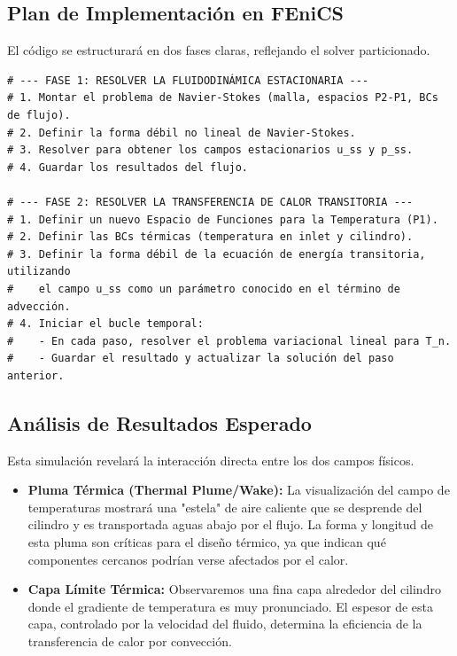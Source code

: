 \subsection{Plan de Implementación en FEniCS}
El código se estructurará en dos fases claras, reflejando el solver particionado.

\begin{tcolorbox}[colback=CodeBackground, title=Estructura del Script de Simulación de Convección Forzada]
\begin{lstlisting}[style=pythonstyle]
# --- FASE 1: RESOLVER LA FLUIDODINÁMICA ESTACIONARIA ---
# 1. Montar el problema de Navier-Stokes (malla, espacios P2-P1, BCs de flujo).
# 2. Definir la forma débil no lineal de Navier-Stokes.
# 3. Resolver para obtener los campos estacionarios u_ss y p_ss.
# 4. Guardar los resultados del flujo.

# --- FASE 2: RESOLVER LA TRANSFERENCIA DE CALOR TRANSITORIA ---
# 1. Definir un nuevo Espacio de Funciones para la Temperatura (P1).
# 2. Definir las BCs térmicas (temperatura en inlet y cilindro).
# 3. Definir la forma débil de la ecuación de energía transitoria, utilizando
#    el campo u_ss como un parámetro conocido en el término de advección.
# 4. Iniciar el bucle temporal:
#    - En cada paso, resolver el problema variacional lineal para T_n.
#    - Guardar el resultado y actualizar la solución del paso anterior.
\end{lstlisting}
\end{tcolorbox}

\subsection{Análisis de Resultados Esperado}
Esta simulación revelará la interacción directa entre los dos campos físicos.
\begin{itemize}
    \item \textbf{Pluma Térmica (Thermal Plume/Wake):} La visualización del campo de temperaturas mostrará una "estela" de aire caliente que se desprende del cilindro y es transportada aguas abajo por el flujo. La forma y longitud de esta pluma son críticas para el diseño térmico, ya que indican qué componentes cercanos podrían verse afectados por el calor.
    \item \textbf{Capa Límite Térmica:} Observaremos una fina capa alrededor del cilindro donde el gradiente de temperatura es muy pronunciado. El espesor de esta capa, controlado por la velocidad del fluido, determina la eficiencia de la transferencia de calor por convección.
\end{itemize}

